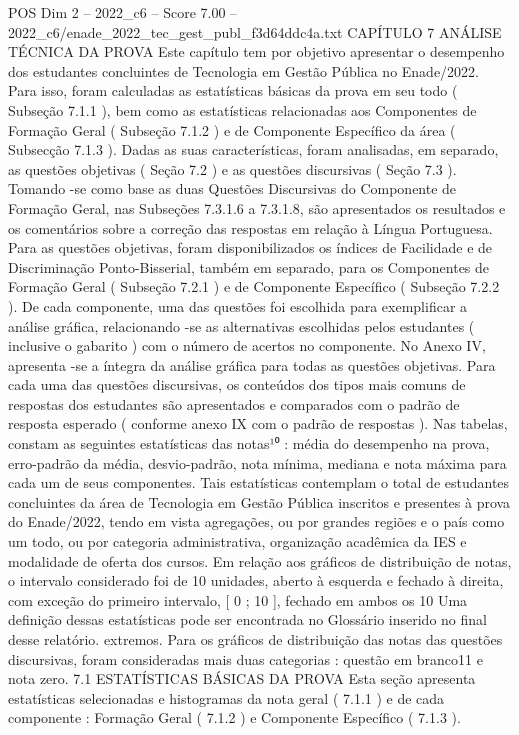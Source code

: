 \begin{textsample}{POS Dim 2 – 2022\_c6 – Score 7.00 – 2022\_c6/enade\_2022\_tec\_gest\_publ\_f3d64ddc4a.txt}  \label{ex:f2_pos_132}
CAPÍTULO 7 ANÁLISE TÉCNICA DA PROVA Este capítulo tem por objetivo apresentar o desempenho dos estudantes concluintes de Tecnologia em Gestão Pública no Enade/2022.
Para isso, foram calculadas as estatísticas básicas da prova em seu todo ( Subseção 7.1.1 ), bem como as estatísticas relacionadas aos Componentes de Formação Geral ( Subseção 7.1.2 ) e de Componente Específico da área ( Subsecção 7.1.3 ).
Dadas as suas características, foram analisadas, em separado, as questões objetivas ( Seção 7.2 ) e as questões discursivas ( Seção 7.3 ).
Tomando -se como base as duas Questões Discursivas do Componente de Formação Geral, nas Subseções 7.3.1.6 a 7.3.1.8, são apresentados os resultados e os comentários sobre a correção das respostas em relação à Língua Portuguesa.
Para as questões objetivas, foram disponibilizados os índices de Facilidade e de Discriminação Ponto-Bisserial, também em separado, para os Componentes de Formação Geral ( Subseção 7.2.1 ) e de Componente Específico ( Subseção 7.2.2 ).
De cada componente, uma das questões foi escolhida para exemplificar a análise gráfica, relacionando -se as alternativas escolhidas pelos estudantes ( inclusive o gabarito ) com o número de acertos no componente.
No Anexo IV, apresenta -se a íntegra da análise gráfica para todas as questões objetivas.
Para cada uma das questões discursivas, os conteúdos dos tipos mais comuns de respostas dos estudantes são apresentados e comparados com o padrão de resposta esperado ( conforme anexo IX com o padrão de respostas ).
Nas tabelas, constam as seguintes estatísticas das notas¹⁰ : média do desempenho na prova, erro-padrão da média, desvio-padrão, nota mínima, mediana e nota máxima para cada um de seus componentes.
Tais estatísticas contemplam o total de estudantes concluintes da área de Tecnologia em Gestão Pública inscritos e presentes à prova do Enade/2022, tendo em vista agregações, ou por grandes regiões e o país como um todo, ou por categoria administrativa, organização acadêmica da IES e modalidade de oferta dos cursos.
Em relação aos gráficos de distribuição de notas, o intervalo considerado foi de 10 unidades, aberto à esquerda e fechado à direita, com exceção do primeiro intervalo, [ 0 ; 10 ], fechado em ambos os 10 Uma definição dessas estatísticas pode ser encontrada no Glossário inserido no final desse relatório. extremos.
Para os gráficos de distribuição das notas das questões discursivas, foram consideradas mais duas categorias : questão em branco11 e nota zero. 7.1 ESTATÍSTICAS BÁSICAS DA PROVA Esta seção apresenta estatísticas selecionadas e histogramas da nota geral ( 7.1.1 ) e de cada componente : Formação Geral ( 7.1.2 ) e Componente Específico ( 7.1.3 ).

\end{textsample}
